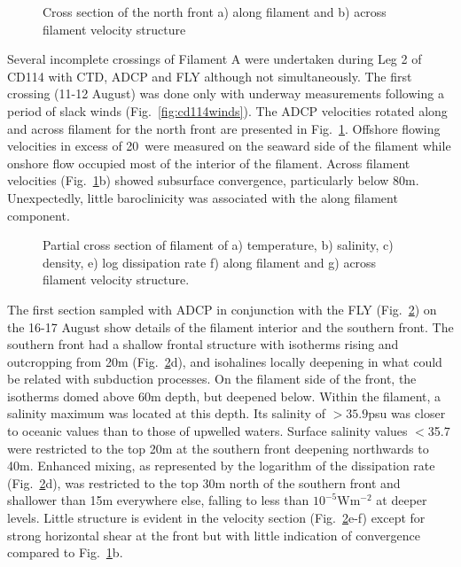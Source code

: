 \begin{figure}
\centering %
 \caption{ Cross
section of the north front a) along filament and b) across
filament velocity structure} \label{fig:cd114fil1vel}
\end{figure}
Several incomplete crossings of Filament A were undertaken during
Leg 2 of CD114 with CTD, ADCP and FLY although not simultaneously.
The first crossing (11-12 August) was done only with underway
measurements following a period of slack winds
(Fig.~\ref{fig:cd114winds}). The ADCP  velocities rotated along
and across filament for the north front are presented in
Fig.~\ref{fig:cd114fil1vel}. Offshore flowing velocities in excess
of 20\velc\,  were measured on the seaward side of the filament
while onshore flow occupied most of the interior of the filament.
Across filament velocities (Fig.~\ref{fig:cd114fil1vel}b) showed
subsurface convergence, particularly below 80m. Unexpectedly,
little baroclinicity was associated with the along filament
component.

\begin{figure}
\begin{widefig}{-.5cm}{-.5cm}
\centering %
%
%
\quad
{}%
%
%
\caption{ Partial cross section of filament of a) temperature, b)
salinity, c) density, e) log dissipation rate f) along filament
and g) across filament velocity structure.}
\label{fig:cd114fil1sec}
\end{widefig}
\end{figure}

The first section sampled with ADCP in conjunction with the FLY
(Fig.~\ref{fig:cd114fil1sec}) on the 16-17 August show details of
the filament interior and the southern front. The southern front
had a shallow frontal structure with isotherms rising and
outcropping from 20m (Fig.~\ref{fig:cd114fil1sec}d), and
isohalines locally deepening in what could be related with
subduction processes. On the filament side of the front, the
isotherms domed above 60m depth, but deepened below. Within the
filament, a salinity maximum was located at this depth. Its
salinity of  $>35.9$psu was closer to oceanic values than to those
of upwelled waters. Surface salinity values $<$35.7 were
restricted to the top 20m at the southern front deepening
northwards to 40m. Enhanced mixing, as represented by the
logarithm of the dissipation rate (Fig.~\ref{fig:cd114fil1sec}d),
was restricted to the top 30m north of the southern front and
shallower than 15m everywhere else, falling to less than $10^{-5}
\mathrm{Wm^{-2}}$ at deeper levels. Little structure is evident in
the velocity section (Fig.~\ref{fig:cd114fil1sec}e-f) except for
strong horizontal shear at the front but with little indication of
convergence compared to Fig.~\ref{fig:cd114fil1vel}b.

